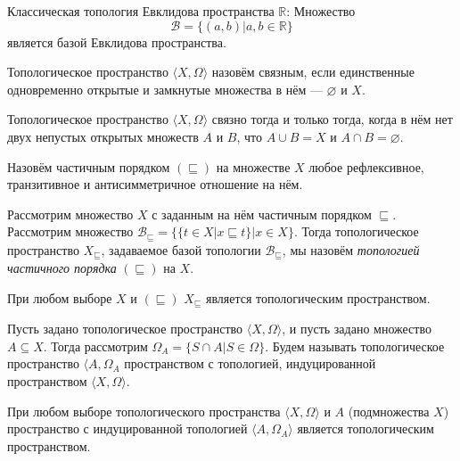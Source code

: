 \begin{theorem} Классическая топология Евклидова пространства $\mathbb{R}$:
    Множество $$\mathcal{B} = \{(a,b)|a,b\in \mathbb{R}\}$$ является базой Евклидова пространства.
\end{theorem}

\begin{definition} Топологическое пространство $\langle X, \Omega \rangle$ назовём 
связным, если единственные одновременно открытые и замкнутые множества в нём --- $\varnothing$ и $X$.
\end{definition}

\begin{theorem} Топологическое пространство $\langle X, \Omega \rangle$ связно тогда и только тогда, 
когда в нём нет двух непустых открытых множеств $A$ и $B$, что $A \cup B = X$ и $A \cap B = \varnothing$.
\end{theorem}

\begin{definition} Назовём частичным порядком $(\sqsubseteq)$ на множестве $X$ любое 
рефлексивное, транзитивное и антисимметричное отношение на нём.
\end{definition}

\begin{definition} Рассмотрим множество $X$ с заданным на нём частичным порядком $\sqsubseteq$.
Рассмотрим множество $\mathcal{B}_\sqsubseteq = \{ \{ t \in X | x \sqsubseteq t \}| x \in X\}$.
Тогда топологическое пространство $X_\sqsubseteq$, задаваемое базой топологии $\mathcal{B}_\sqsubseteq$,
мы назовём \emph{топологией частичного порядка} $(\sqsubseteq)$ на $X$.
\end{definition}

\begin{theorem} При любом выборе $X$ и $(\sqsubseteq)$ $X_\sqsubseteq$ является топологическим пространством.
\end{theorem}

\begin{definition} Пусть задано топологическое пространство $\langle X, \Omega \rangle$, и пусть
задано множество $A \subseteq X$. Тогда рассмотрим $\Omega_A = \{ S \cap A | S \in \Omega \}$.
Будем называть топологическое пространство $\langle A, \Omega_A$ пространством с топологией,
индуцированной пространством $\langle X, \Omega \rangle$.
\end{definition}

\begin{theorem} При любом выборе топологического пространства $\langle X, \Omega \rangle$ и 
$A$ (подмножества $X$) пространство с индуцированной топологией 
$\langle A, \Omega_A \rangle$ является топологическим пространством.
\end{theorem}

